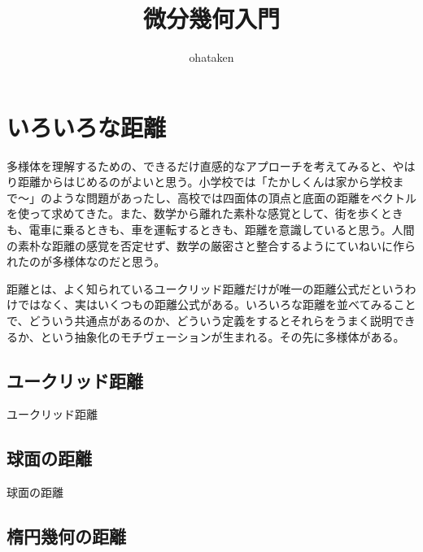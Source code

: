 \title{ \huge 微分幾何入門 }
\author{ ohataken }
\maketitle

\newpage


\section{ いろいろな距離 }

多様体を理解するための、できるだけ直感的なアプローチを考えてみると、やはり距離からはじめるのがよいと思う。小学校では「たかしくんは家から学校まで〜」のような問題があったし、高校では四面体の頂点と底面の距離をベクトルを使って求めてきた。また、数学から離れた素朴な感覚として、街を歩くときも、電車に乗るときも、車を運転するときも、距離を意識していると思う。人間の素朴な距離の感覚を否定せず、数学の厳密さと整合するようにていねいに作られたのが多様体なのだと思う。

距離とは、よく知られているユークリッド距離だけが唯一の距離公式だというわけではなく、実はいくつもの距離公式がある。いろいろな距離を並べてみることで、どういう共通点があるのか、どういう定義をするとそれらをうまく説明できるか、という抽象化のモチヴェーションが生まれる。その先に多様体がある。

\newpage


\subsection{ ユークリッド距離 }

ユークリッド距離

\newpage


\subsection{ 球面の距離 }

球面の距離

\newpage


\subsection{ 楕円幾何の距離 }

